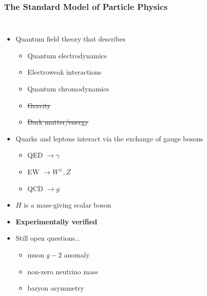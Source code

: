 \begin{frame}
  \frametitle{\textbf{The Standard Model of Particle Physics}}
  \begin{columns}
    \begin{itemize}
    \item Quantum field theory that describes
      \begin{itemize}
      \item Quantum electrodynamics
      \item Electroweak interactions
      \item Quantum chromodynamics
      \item \st{Gravity}
      \item \st{Dark matter/energy}
      \end{itemize}
    \item Quarks and leptons interact via the exchange of gauge bosons
      \begin{itemize}
      \item QED $\to \gamma$
      \item EW $\to W^{\pm}, Z$
      \item QCD $\to g$
      \end{itemize}
    \item $H$ is a mass-giving scalar boson
    \item \textbf{Experimentally verified}
    \item Still open questions...
      \begin{itemize}
      \item muon $g-2$ anomaly
      \item non-zero neutrino mass
      \item baryon asymmetry
      \end{itemize}
    \end{itemize}
  \end{columns}
\end{frame}
